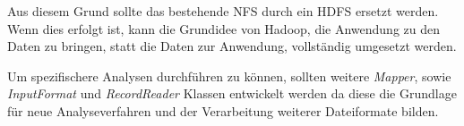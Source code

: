Aus diesem Grund sollte das bestehende \ac{NFS} durch ein \ac{HDFS} ersetzt werden. Wenn dies erfolgt ist, kann die Grundidee von Hadoop, die Anwendung zu den Daten zu bringen, statt die Daten zur Anwendung, vollständig umgesetzt werden.

Um spezifischere Analysen durchführen zu können, sollten weitere \textit{Mapper}, sowie \textit{InputFormat} und \textit{RecordReader} Klassen entwickelt werden da diese die Grundlage für neue Analyseverfahren und der Verarbeitung weiterer Dateiformate bilden.

